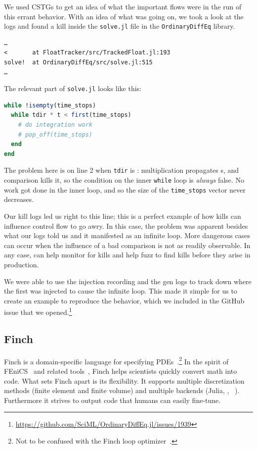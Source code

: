 \documentclass{juliacon}
\begin{document}
We used CSTGs to get an idea of what the important flows were in the run of this errant behavior.
With an idea of what was going on, we took a look at the logs and found a \NaN{} kill inside the \texttt{solve.jl} file in the \texttt{OrdinaryDiffEq} library.

\begin{verbatim}
…
<       at FloatTracker/src/TrackedFloat.jl:193
solve!  at OrdinaryDiffEq/src/solve.jl:515
…
\end{verbatim}

The relevant part of \texttt{solve.jl} looks like this:


\begin{lstlisting}[language = Julia]
while !isempty(time_stops)
  while tdir * t < first(time_stops)
    # do integration work
    # pop_off(time_stops)
  end
end
\end{lstlisting}

The problem here is on line 2 when \texttt{tdir} is \NaN{}: multiplication propagates \NaN{}s, and comparison kills it, so the condition on the inner \texttt{while} loop is \emph{always} false.
No work got done in the inner loop, and so the size of the \texttt{time\_stops} vector never decreases.

Our kill logs led us right to this line; this is a perfect example of how \NaN{} kills can influence control flow to go awry.
In this case, the problem was apparent besides what our logs told us and it manifested as an infinite loop.
More dangerous cases can occur when the influence of a bad comparison is not as readily observable.
In any case, \FT{} can help monitor for kills and help fuzz to find kills before they arise in production.

We were able to use the injection recording and the gen logs to track down where the first \NaN{} was injected to cause the infinite loop.
This made it simple for us to create an example to reproduce the behavior, which we included in the GitHub issue that we opened.\footnote{\url{https://github.com/SciML/OrdinaryDiffEq.jl/issues/1939}}

\subsection{Finch}
\label{s:finch}

Finch is a domain-specific language for specifying
PDEs~\cite{heislerFinchDomainSpecific2022}.\footnote{Not to be confused
with the Finch loop optimizer~\cite{adka-cgo-2023}.}
In the spirit of FEniCS~\cite{fenics} and related
tools~\cite{freefem,openfoam,dune,firedrake},
Finch helps scientists quickly convert math into code.
What sets Finch apart is its flexibility.
It supports multiple discretization methods (finite element and finite
volume) and multiple backends (Julia, \CPP{}, \Dendro{}~\cite{dendro}).
Furthermore it strives to output code that humans can easily fine-tune.
\end{document}
